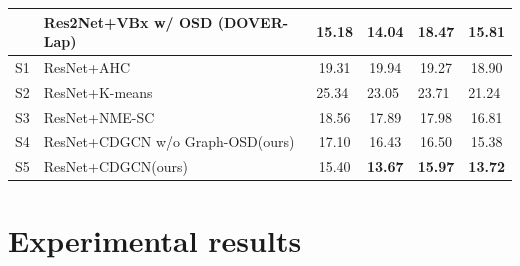 \documentclass[10pt]{article}
\begin{document}
\begin{table}[]
\begin{tabular}{clcccc}
                                            & Res2Net+VBx w/ OSD (DOVER-Lap)\cite{horiguchi2021hitachi} & \multicolumn{1}{l}{15.18} & \multicolumn{1}{l}{14.04} & \multicolumn{1}{l}{18.47} & \multicolumn{1}{l}{15.81} \\ \hline
S1                                          & ResNet+AHC                                                    & 19.31                     & 19.94                     & 19.27                     & 18.90                     \\
S2                                          & ResNet+K-means                                                & \multicolumn{1}{l}{25.34} & \multicolumn{1}{l}{23.05} & \multicolumn{1}{l}{23.71} & \multicolumn{1}{l}{21.24} \\
S3                                          & ResNet+NME-SC                                                 & 18.56                     & 17.89                     & 17.98                     & 16.81                     \\
S4                                          & ResNet+CDGCN w/o Graph-OSD(ours)                                  & 17.10                     & 16.43                     & 16.50                     & 15.38                     \\
S5                                          & ResNet+CDGCN(ours)                                   & 15.40            & \textbf{13.67}            & \textbf{15.97}            & \textbf{13.72}            \\ \hline
\end{tabular}
\vspace{-0.3cm}
\end{table}

\section{Experimental results}
\label{sec:experiment}
\end{document}
